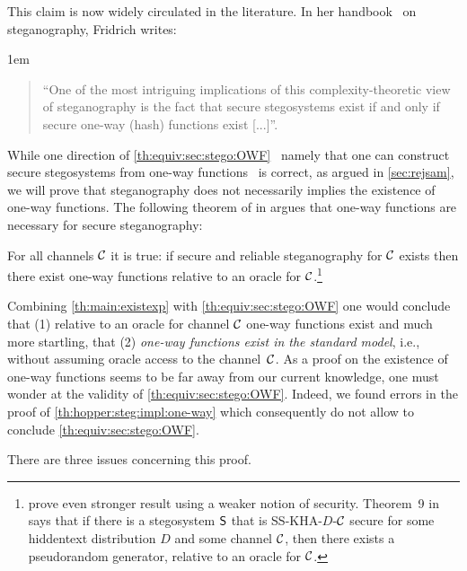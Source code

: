 This claim is now widely circulated in the literature.
In her handbook~\cite[p.~101]{fridrich2009steganography} on steganography, Fridrich writes: 
{\advance\leftmargini 1em
\begin{quote}
  ``One of the most intriguing implications of this complexity-theoretic
  view of steganography is the fact that secure stegosystems exist
  if and only if secure one-way (hash) functions exist [...]''. %
\end{quote}}

While one direction of \autoref{th:equiv:sec:stego:OWF} \textendash\
namely that one can construct secure stegosystems from one-way functions
\textendash\ is correct, as argued in \autoref{sec:rejsam}, we will
prove that steganography does not necessarily implies the existence of
one-way functions. The following theorem of
\citeauthor{hopper2009provably} in \cite{hopper2009provably} argues that
one-way functions are necessary for secure steganography:

\begin{theorem}
\label{th:hopper:steg:impl:one-way}
For all channels $\mathcal{C}$ it is true: if secure and reliable steganography
for $\mathcal{C}$ exists then there exist one-way functions relative to an
oracle for $\mathcal{C}$.\footnote{\citeauthor{hopper2009provably}  prove even stronger result
  using a weaker notion of security. Theorem~9 in
  \cite{hopper2009provably} says that if there is a stegosystem $\operatorname{\mathsf{S}}$
  that is \acs{SS-KHA}-$D$-$\mathcal{C}$ secure for some hiddentext distribution
  $D$ and some channel $\mathcal{C}$, then there exists a pseudorandom
  generator, relative to an oracle for $\mathcal{C}$.}
\end{theorem}

Combining \autoref{th:main:existexp} with
\autoref{th:equiv:sec:stego:OWF}
one would conclude that (1) relative to
an oracle for channel $\mathcal{C}$ one-way functions exist and much more
startling, that (2) \emph{one-way functions exist in the standard
  model}, i.e., without assuming oracle access to the channel~$\mathcal{C}$. As
a proof on the existence of one-way functions seems to be far away from
our current knowledge, one must wonder at the validity of
\autoref{th:equiv:sec:stego:OWF}. Indeed, we found errors in the proof
of \autoref{th:hopper:steg:impl:one-way} which consequently do not
allow to conclude \autoref{th:equiv:sec:stego:OWF}.


There are three issues concerning this proof.

